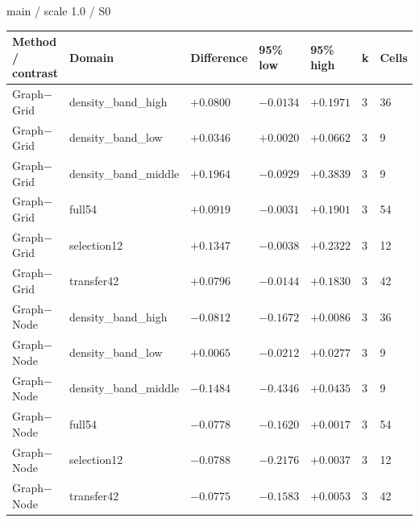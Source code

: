 \par\noindent main / scale 1.0 / S0
\par\nopagebreak[4]
\begin{tabular}{lllllll}
\hline
Method / contrast & Domain & Difference & 95\% low & 95\% high & k & Cells \\
\hline
Graph\ensuremath{-}Grid & density\_band\_high & $+0.0800$ & $-0.0134$ & $+0.1971$ & 3 & 36 \\
Graph\ensuremath{-}Grid & density\_band\_low & $+0.0346$ & $+0.0020$ & $+0.0662$ & 3 & 9 \\
Graph\ensuremath{-}Grid & density\_band\_middle & $+0.1964$ & $-0.0929$ & $+0.3839$ & 3 & 9 \\
Graph\ensuremath{-}Grid & full54 & $+0.0919$ & $-0.0031$ & $+0.1901$ & 3 & 54 \\
Graph\ensuremath{-}Grid & selection12 & $+0.1347$ & $-0.0038$ & $+0.2322$ & 3 & 12 \\
Graph\ensuremath{-}Grid & transfer42 & $+0.0796$ & $-0.0144$ & $+0.1830$ & 3 & 42 \\
Graph\ensuremath{-}Node & density\_band\_high & $-0.0812$ & $-0.1672$ & $+0.0086$ & 3 & 36 \\
Graph\ensuremath{-}Node & density\_band\_low & $+0.0065$ & $-0.0212$ & $+0.0277$ & 3 & 9 \\
Graph\ensuremath{-}Node & density\_band\_middle & $-0.1484$ & $-0.4346$ & $+0.0435$ & 3 & 9 \\
Graph\ensuremath{-}Node & full54 & $-0.0778$ & $-0.1620$ & $+0.0017$ & 3 & 54 \\
Graph\ensuremath{-}Node & selection12 & $-0.0788$ & $-0.2176$ & $+0.0037$ & 3 & 12 \\
Graph\ensuremath{-}Node & transfer42 & $-0.0775$ & $-0.1583$ & $+0.0053$ & 3 & 42 \\
\hline
\end{tabular}
